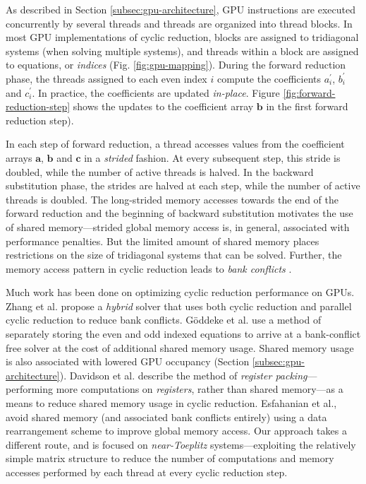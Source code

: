 \documentclass{elsarticle}
\begin{document}
As described in Section \ref{subsec:gpu-architecture},
GPU instructions are executed concurrently
by several threads and
threads are organized into thread blocks.
In most GPU implementations of cyclic reduction,
blocks are assigned to tridiagonal systems
(when solving multiple systems),
and threads within a block 
are assigned to equations, or \emph{indices}
(Fig. \ref{fig:gpu-mapping}).
During the forward reduction phase,
the threads assigned to each even index $i$
compute the coefficients
$a_i^\prime$, $b_i^\prime$ and $c_i^\prime$.
In practice, the coefficients are updated \emph{in-place}.
Figure \ref{fig:forward-reduction-step} shows the updates
to the coefficient array $\bm{b}$ in the first forward reduction step).

In each step of forward reduction,
a thread accesses values from the coefficient arrays
$\bm{a}$, $\bm{b}$ and $\bm{c}$ in a \emph{strided} fashion.
At every subsequent step,
this stride is doubled, while the number of active threads is halved.
In the backward substitution phase,
the strides are halved at each step,
while the number of active threads is doubled.
The long-strided memory accesses towards the end
of the forward reduction
and the beginning of backward substitution
motivates the use of shared memory---strided global memory access is,
in general, associated with performance penalties.
But the limited amount of shared memory places restrictions
on the size of tridiagonal systems that can be solved.
Further,
the memory access pattern in
cyclic reduction leads to \emph{bank conflicts}
\cite{Zhang2010FTS}.

Much work has been done on optimizing cyclic reduction performance
on GPUs.
Zhang et al. \cite{Zhang2010FTS} propose a
\emph{hybrid} solver
that uses both cyclic reduction and parallel cyclic reduction
to reduce bank conflicts.
G{\"o}ddeke et al. \cite{GoSt11CR}
use a method of separately storing
the even and odd indexed equations
to arrive at a bank-conflict free solver
at the cost of additional shared memory usage.
Shared memory usage is also associated with
lowered GPU occupancy (Section \ref{subsec:gpu-architecture}).
Davidson et al. \cite{davidson2011register}
describe the method of
\emph{register packing}---performing more computations
on \emph{registers}, rather than shared memory---as
a means to reduce shared memory usage in cyclic reduction.
Esfahanian et al., \cite{esfahanian2014efficient}
avoid shared memory (and associated bank conflicts entirely)
using a data rearrangement scheme to improve global memory access.
Our approach takes a different route,
and is focused on \emph{near-Toeplitz} systems---exploiting
the relatively simple matrix structure
to reduce the number of computations and memory accesses
performed by each thread
at every cyclic reduction step.
\end{document}
